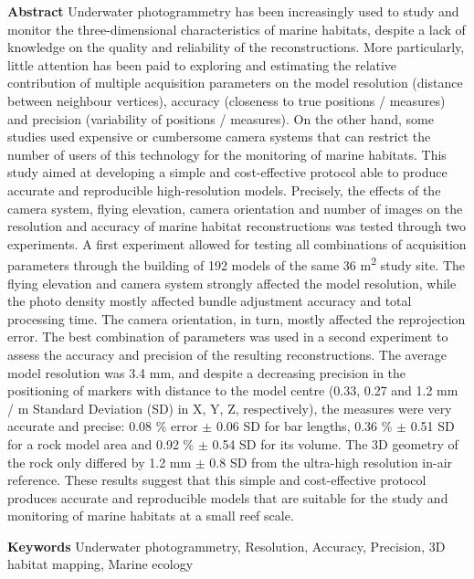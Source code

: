 \medskip

\noindent\textbf{Abstract}
Underwater photogrammetry has been increasingly used to study and monitor the three-dimensional characteristics of marine habitats, despite a lack of knowledge on the quality and reliability of the reconstructions. More particularly, little attention has been paid to exploring and estimating the relative contribution of multiple acquisition parameters on the model resolution (distance between neighbour vertices), accuracy (closeness to true positions / measures) and precision (variability of positions / measures). On the other hand, some studies used expensive or cumbersome camera systems that can restrict the number of users of this technology for the monitoring of marine habitats. This study aimed at developing a simple and cost-effective protocol able to produce accurate and reproducible high-resolution models. Precisely, the effects of the camera system, flying elevation, camera orientation and number of images on the resolution and accuracy of marine habitat reconstructions was tested through two experiments. A first experiment allowed for testing all combinations of acquisition parameters through the building of 192 models of the same 36 m\textsuperscript{2} study site. The flying elevation and camera system strongly affected the model resolution, while the photo density mostly affected bundle adjustment accuracy and total processing time. The camera orientation, in turn, mostly affected the reprojection error. The best combination of parameters was used in a second experiment to assess the accuracy and precision of the resulting reconstructions. The average model resolution was 3.4 mm, and despite a decreasing precision in the positioning of markers with distance to the model centre (0.33, 0.27 and 1.2 mm / m Standard Deviation (SD) in X, Y, Z, respectively), the measures were very accurate and precise: 0.08 \% error $\pm$ 0.06 SD for bar lengths, 0.36 \% $\pm$ 0.51 SD for a rock model area and 0.92 \% $\pm$ 0.54 SD for its volume. The 3D geometry of the rock only differed by 1.2 mm $\pm$ 0.8 SD from the ultra-high resolution in-air reference. These results suggest that this simple and cost-effective protocol produces accurate and reproducible models that are suitable for the study and monitoring of marine habitats at a small reef scale.

\medskip
\noindent\textbf{Keywords}
Underwater photogrammetry, Resolution, Accuracy, Precision, 3D habitat mapping, Marine ecology

